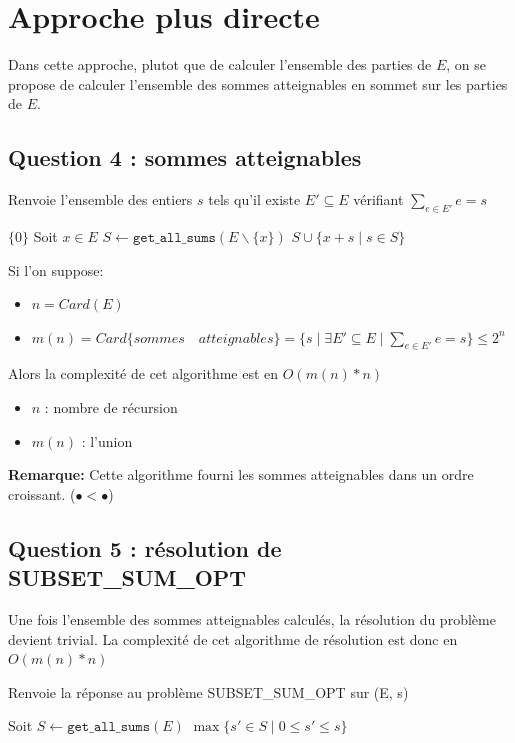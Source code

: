 \documentclass[10pt]{article}
\let\oldReturn\Return
\renewcommand{\Return}{\State\oldReturn}
\begin{document}
	\newpage
	\section{Approche plus directe}\label{approche_plus_directe}
		Dans cette approche, plutot que de calculer l'ensemble des parties de $E$,
		on se propose de calculer l'ensemble des sommes atteignables en sommet sur les parties de $E$.
		
		\subsection{Question 4 : sommes atteignables}\label{get_all_sums}
			\begin{algorithm}
				\caption{Renvoie l'ensemble des entiers $s$ tels qu'il existe $E' \subseteq E$ vérifiant $\sum\limits_{e \in E'}e = s$}
				\begin{algorithmic}[1]
							\Return $\{0\}$
						\EndIf
						\State Soit $x \in E$
						\State $S \leftarrow \mathtt{get\_all\_sums}(E \backslash \{x\})$
						\Return $S \cup \{x + s \mid s \in S\}$
					\EndFunction
				\end{algorithmic}
			\end{algorithm}
			Si l'on suppose:
			\begin{itemize}[label=-]
				\setlength\itemsep{0.1em}
				\item $n = Card(E)$
				\item $m(n) = Card\{sommes \quad atteignables\} = \{s \mid \exists E' \subseteq E \mid \sum\limits_{e \in E'}e = s\} \leq 2^n$
			\end{itemize}
			Alors la complexité de cet algorithme est en $\boxed{O(m(n) * n)}$
			\begin{itemize}[label=-]
				\setlength\itemsep{0.1em}
				\item $n$ : nombre de récursion
				\item $m(n)$ : l'union
			\end{itemize}
			\textbf{Remarque:} Cette algorithme fourni les sommes atteignables dans un ordre croissant. ($\bullet < \bullet$)

		\subsection{Question 5 : résolution de SUBSET\_SUM\_OPT}
			Une fois l'ensemble des sommes atteignables calculés, la résolution du problème devient trivial.
			La complexité de cet algorithme de résolution est donc en $\boxed{O(m(n) * n)}$
			\begin{algorithm}
				\caption{Renvoie la réponse au problème SUBSET\_SUM\_OPT sur (E, s)}
				\begin{algorithmic}[1]
					\Function{subset\_sum}{$E \subset \mathbb{N}, s \in \mathbb{N}$}
						\State Soit $S \leftarrow \mathtt{get\_all\_sums}(E)$
						\Return $\max\{s' \in S \mid 0 \leq s' \leq s\}$
					\EndFunction
				\end{algorithmic}
			\end{algorithm}
\end{document}
